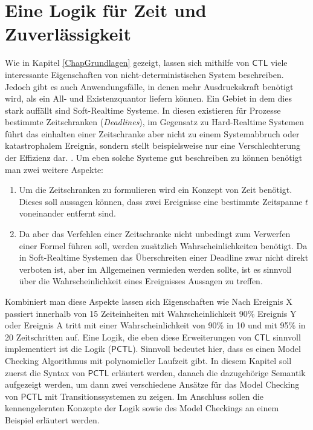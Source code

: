 \documentclass{lni}
\theoremstyle{def_style}
\theoremstyle{break}
\newcommand{\CTL}{\mathsf{CTL}}
\newcommand{\PCTL}{\mathsf{PCTL}}
\begin{document}
\section{Eine Logik für Zeit und Zuverlässigkeit}


Wie in Kapitel \ref{ChapGrundlagen} gezeigt, lassen sich mithilfe von $\CTL$ viele interessante Eigenschaften von nicht-deterministischen System beschreiben. 
Jedoch gibt es auch Anwendungsfälle, in denen mehr Ausdruckskraft benötigt wird, als ein All- und Existenzquantor liefern können.
Ein Gebiet in dem dies stark auffällt sind Soft-Realtime Systeme. 
In diesen existieren für Prozesse bestimmte Zeitschranken (\textit{Deadlines}), im Gegensatz zu Hard-Realtime Systemen führt das einhalten einer Zeitschranke aber nicht zu einem Systemabbruch oder katastrophalem Ereignis, sondern stellt beispielsweise nur eine Verschlechterung der Effizienz dar. \cite{hansson1994logic}.
Um eben solche Systeme gut beschreiben zu können benötigt man zwei weitere Aspekte:
\begin{enumerate}
	\item Um die Zeitschranken zu formulieren wird ein Konzept von Zeit benötigt. Dieses soll aussagen können, dass zwei Ereignisse eine bestimmte Zeitspanne $t$ voneinander entfernt sind.
	\item Da aber das Verfehlen einer Zeitschranke nicht unbedingt zum Verwerfen einer Formel führen soll, werden zusätzlich Wahrscheinlichkeiten benötigt. 
	Da in Soft-Realtime Systemen das Überschreiten einer Deadline zwar nicht direkt verboten ist, aber im Allgemeinen vermieden werden sollte, ist es sinnvoll über die Wahrscheinlichkeit eines Ereignisses Aussagen zu treffen.
\end{enumerate}
Kombiniert man diese Aspekte lassen sich Eigenschaften wie \glqq Nach Ereignis X passiert innerhalb von 15 Zeiteinheiten mit Wahrscheinlichkeit 90\% Ereignis Y\grqq{} oder \glqq Ereignis A tritt mit einer Wahrscheinlichkeit von 90\% in 10 und mit 95\% in 20 Zeitschritten auf\grqq. 
Eine Logik, die eben diese Erweiterungen von $\CTL$ sinnvoll implementiert ist die Logik  ($\PCTL$). 
Sinnvoll bedeutet hier, dass es einen Model Checking Algorithmus mit polynomieller Laufzeit gibt. 
In diesem Kapitel soll zuerst die Syntax von $\PCTL$ erläutert werden, danach die dazugehörige Semantik aufgezeigt werden, um dann zwei verschiedene Ansätze für das Model Checking von $\PCTL$ mit Transitionssystemen zu zeigen. 
Im Anschluss sollen die kennengelernten Konzepte der Logik sowie des Model Checkings an einem Beispiel erläutert werden.
\end{document}
